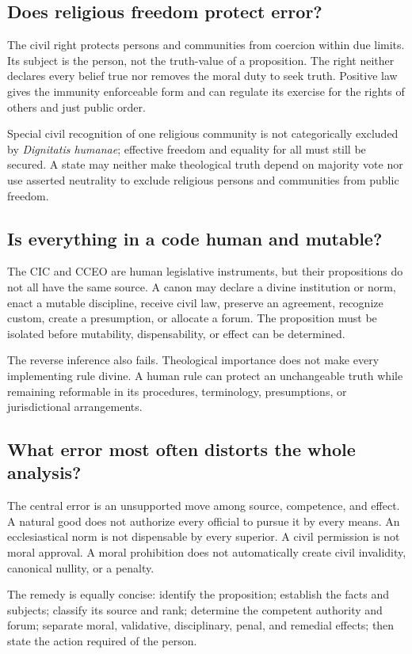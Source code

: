 \subsection{Does religious freedom protect error?}

The civil right protects persons and communities from coercion within due limits. Its subject is the person, not the truth-value of a proposition. The right neither declares every belief true nor removes the moral duty to seek truth. Positive law gives the immunity enforceable form and can regulate its exercise for the rights of others and just public order.

Special civil recognition of one religious community is not categorically excluded by \emph{Dignitatis humanae}; effective freedom and equality for all must still be secured. A state may neither make theological truth depend on majority vote nor use asserted neutrality to exclude religious persons and communities from public freedom.

\subsection{Is everything in a code human and mutable?}

The CIC and CCEO are human legislative instruments, but their propositions do not all have the same source. A canon may declare a divine institution or norm, enact a mutable discipline, receive civil law, preserve an agreement, recognize custom, create a presumption, or allocate a forum. The proposition must be isolated before mutability, dispensability, or effect can be determined.

The reverse inference also fails. Theological importance does not make every implementing rule divine. A human rule can protect an unchangeable truth while remaining reformable in its procedures, terminology, presumptions, or jurisdictional arrangements.

\subsection{What error most often distorts the whole analysis?}

The central error is an unsupported move among source, competence, and effect. A natural good does not authorize every official to pursue it by every means. An ecclesiastical norm is not dispensable by every superior. A civil permission is not moral approval. A moral prohibition does not automatically create civil invalidity, canonical nullity, or a penalty.

The remedy is equally concise: identify the proposition; establish the facts and subjects; classify its source and rank; determine the competent authority and forum; separate moral, validative, disciplinary, penal, and remedial effects; then state the action required of the person.
